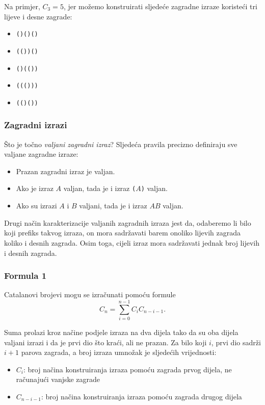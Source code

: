 Na primjer, $C_3=5$, jer
možemo konstruirati sljedeće zagradne
izraze koristeći tri
lijeve i desne zagrade:

\begin{itemize}[noitemsep]
\item \texttt{()()()}
\item \texttt{(())()}
\item \texttt{()(())}
\item \texttt{((()))}
\item \texttt{(()())}
\end{itemize}

\subsubsection{Zagradni izrazi}


Što je točno \emph{valjani zagradni izraz}?
Sljedeća pravila precizno definiraju sve
valjane zagradne izraze:

\begin{itemize}
\item Prazan zagradni izraz je valjan.
\item Ako je izraz $A$ valjan,
tada je i izraz
\texttt{(}$A$\texttt{)} valjan.
\item Ako su izrazi $A$ i $B$ valjani,
tada je i izraz $AB$ valjan.
\end{itemize}

Drugi način karakterizacije valjanih
zagradnih izraza jest da,
odaberemo li bilo koji prefiks takvog izraza,
on mora sadržavati barem onoliko lijevih
zagrada koliko i desnih zagrada.
Osim toga, cijeli izraz mora
sadržavati jednak broj lijevih i desnih
zagrada.

\subsubsection{Formula 1}

Catalanovi brojevi mogu se izračunati pomoću formule
\[ C_n = \sum_{i=0}^{n-1} C_{i} C_{n-i-1}.\]

Suma prolazi kroz načine podjele
izraza na dva dijela
tako da su oba dijela valjani
izrazi i da je prvi dio što kraći,
ali ne prazan.
Za bilo koji $i$, prvi dio sadrži $i+1$ parova
zagrada, a broj izraza
umnožak je sljedećih vrijednosti:

\begin{itemize}
\item $C_{i}$: broj načina konstruiranja izraza
pomoću zagrada prvog dijela,
ne računajući vanjske zagrade
\item $C_{n-i-1}$: broj načina konstruiranja
izraza pomoću zagrada drugog dijela
\end{itemize}

